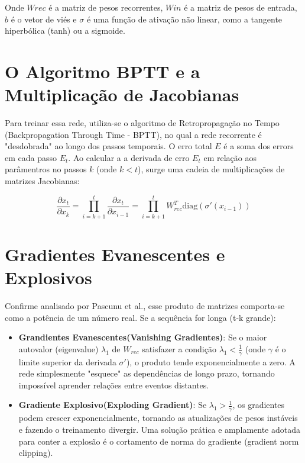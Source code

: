 \documentclass[11pt]{article}
\begin{document}
Onde \(W{rec}\) é a matriz de pesos recorrentes, \(W{in}\) é a matriz de pesos de entrada, \(b\) é o vetor de viés e \(\sigma\) é uma função de ativação não linear, como a tangente hiperbólica (tanh) ou a sigmoide.

\section{O Algoritmo BPTT e a Multiplicação de Jacobianas}

Para treinar essa rede, utiliza-se o algoritmo de Retropropagação no Tempo (Backpropagation Through Time - BPTT), no qual a rede recorrente é "desdobrada" ao longo dos passos temporais. O erro total \(E\) é a soma dos errors em cada passo \(E_t\). Ao calcular a a derivada de erro \(E_t\) em relação aos parâmentros no passos \(k\) (onde \(k < t\)), surge uma cadeia de multiplicações de matrizes Jacobianas:

\begin{equation}
  \frac{\partial x_t}{\partial x_k} = \prod_{i=k+1}^{t} \frac{\partial x_t}{\partial x_{i-1}} = \prod_{i=k+1}^{t} W_{rec}^T \text{diag}(\sigma'(x_{i-1}))
\end{equation}

\section{Gradientes Evanescentes e Explosivos}

Confirme analisado por Pascunu et al., esse produto de matrizes comporta-se como a potência de um número real. Se a sequência for longa (t-k grande):

\begin{itemize}
  \item \textbf{Grandientes Evanescentes(Vanishing Gradientes)}: Se o maior autovalor (eigenvalue) \(\lambda_1\) de \(W_{rec}\) satisfazer a condição \(\lambda_1 < \frac{1}{\gamma}\) (onde \(\gamma\) é o limite superior da derivada \(\sigma'\)), o produto tende exponencialmente a zero. A rede simplesmente "esquece" as dependências de longo prazo, tornando impossível aprender relações entre eventos distantes.
  \item \textbf{Gradiente Explosivo(Exploding Gradient)}: Se \(\lambda_1 > \frac{1}{\gamma}\), os gradientes podem crescer exponencialmente, tornando as atualizações de pesos instáveis e fazendo o treinamento divergir. Uma solução prática e amplamente adotada para conter a explosão é o cortamento de norma do gradiente (gradient norm clipping).
\end{itemize}
\end{document}
